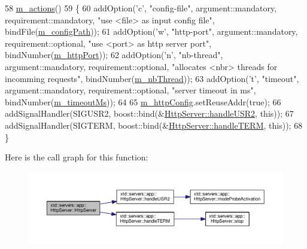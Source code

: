 \begin{DoxyCode}
58   \hyperlink{classxtd_1_1servers_1_1app_1_1HttpServer_afa5363da18a3aa9de651e53e409116e9}{m\_actions}()
59 \{
60   addOption(\textcolor{charliteral}{'c'}, \textcolor{stringliteral}{"config-file"}, argument::mandatory, requirement::mandatory, \textcolor{stringliteral}{"use <file> as input config
       file"},                bindFile(\hyperlink{classxtd_1_1servers_1_1app_1_1HttpServer_aa07526617267875dd907e29b99711ab6}{m\_configPath}));
61   addOption(\textcolor{charliteral}{'w'}, \textcolor{stringliteral}{"http-port"},   argument::mandatory, requirement::optional,  \textcolor{stringliteral}{"use <port> as http server
       port"},                 bindNumber(\hyperlink{classxtd_1_1servers_1_1app_1_1HttpServer_a75ed3bcfa895cad365f6bf0955efcf9e}{m\_httpPort}));
62   addOption(\textcolor{charliteral}{'n'}, \textcolor{stringliteral}{"nb-thread"},   argument::mandatory, requirement::optional,  \textcolor{stringliteral}{"allocates <nbr> threads for
       incomming requests"}, bindNumber(\hyperlink{classxtd_1_1servers_1_1app_1_1HttpServer_a2f0812d24ccfd55e943f3144c672b473}{m\_nbThread}));
63   addOption(\textcolor{charliteral}{'t'}, \textcolor{stringliteral}{"timeout"},     argument::mandatory, requirement::optional,  \textcolor{stringliteral}{"server timeout in ms"},       
                          bindNumber(\hyperlink{classxtd_1_1servers_1_1app_1_1HttpServer_adcaefcc003e9503dbe6ebea90bf70ef7}{m\_timeoutMs}));
64 
65   \hyperlink{classxtd_1_1servers_1_1app_1_1HttpServer_ad5f2480d758b731b641e4858f556a3c3}{m\_httpConfig}.setReuseAddr(\textcolor{keyword}{true});
66   addSignalHandler(SIGUSR2, boost::bind(&\hyperlink{classxtd_1_1servers_1_1app_1_1HttpServer_a6c6bb7c70218f171e327ed2197d0f6dc}{HttpServer::handleUSR2}, \textcolor{keyword}{this}));
67   addSignalHandler(SIGTERM, boost::bind(&\hyperlink{classxtd_1_1servers_1_1app_1_1HttpServer_a022eecad815296f1d27b19a4b6cca908}{HttpServer::handleTERM}, \textcolor{keyword}{this}));
68 \}
\end{DoxyCode}


Here is the call graph for this function\+:
\nopagebreak
\begin{figure}[H]
\begin{center}
\leavevmode
\includegraphics[width=350pt]{classxtd_1_1servers_1_1app_1_1HttpServer_a3ebbe8af998a3e3738e41a72375ffea9_cgraph}
\end{center}
\end{figure}


